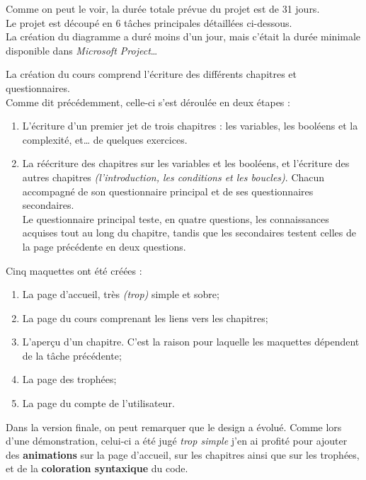 Comme on peut le voir, la durée totale prévue du projet est de 31 jours.\\

Le projet est découpé en 6 tâches principales détaillées ci-dessous. \\

La création du diagramme a duré moins d'un jour, mais c'était la durée minimale disponible dans \textit{Microsoft Project}… \\

\newpage

La création du cours comprend l'écriture des différents chapitres et questionnaires. \\
Comme dit précédemment, celle-ci s'est déroulée en deux étapes :
\begin{enumerate}

    \item L'écriture d'un premier jet de trois chapitres : les variables, les booléens et la complexité, et… de quelques exercices.
    \item La réécriture des chapitres sur les variables et les booléens, et l'écriture des autres chapitres \textit{(l'introduction, les conditions et les boucles)}. Chacun accompagné de son questionnaire principal et de ses questionnaires secondaires. \\
    Le questionnaire principal teste, en quatre questions, les connaissances acquises tout au long du chapitre, tandis que les secondaires testent celles de la page précédente en deux questions.\\
    
\end{enumerate}

Cinq maquettes ont été créées :
\begin{enumerate}

    \item La page d'accueil, très \textit{(trop)} simple et sobre;
    \item La page du cours comprenant les liens vers les chapitres;
    \item L'aperçu d'un chapitre. C'est la raison pour laquelle les maquettes dépendent de la tâche précédente;
    \item La page des trophées;
    \item La page du compte de l'utilisateur. \\
    
\end{enumerate}

Dans la version finale, on peut remarquer que le design a évolué. Comme lors d'une démonstration, celui-ci a été jugé \og \textit{trop simple} \fg j'en ai profité pour ajouter des \textbf{animations} sur la page d’accueil, sur les chapitres ainsi que sur les trophées, et de la \textbf{coloration syntaxique} du code. \\

